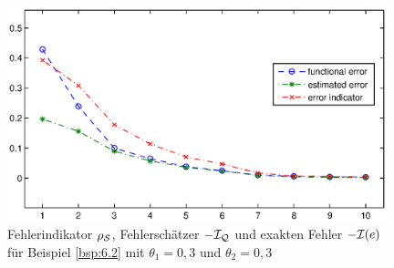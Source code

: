 \begin{bsp}
\begin{figure}[h]
\begin{center}
\includegraphics[width=11cm]{Abbildungen/adaptive_solution_example2.eps}
\end{center}
\caption[Diagramm mit dem Fehler und der Oszillation für Beispiel \ref{bsp:6.2}]{Fehlerindikator $\rho_{\mathcal S}$, Fehlerschätzer $-\mathcal I_{\mathcal Q}$ und exakten Fehler $-\mathcal I(e)$ für Beispiel \ref{bsp:6.2} mit $\theta_1=0,3$ und $\theta_2=0,3$\label{abb:6.6}}
\end{figure}
\end{bsp}

\clearpage

